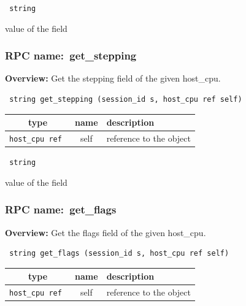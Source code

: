 \vspace{0.3cm}

{\tt 
string
}


value of the field
\vspace{0.3cm}
\vspace{0.3cm}
\vspace{0.3cm}
\subsubsection{RPC name:~get\_stepping}

{\bf Overview:} 
Get the stepping field of the given host\_cpu.

\begin{verbatim} string get_stepping (session_id s, host_cpu ref self)\end{verbatim}



 
\vspace{0.3cm}
\begin{tabular}{|c|c|p{7cm}|}
 \hline
{\bf type} & {\bf name} & {\bf description} \\ \hline
{\tt host\_cpu ref } & self & reference to the object \\ \hline 

\end{tabular}

\vspace{0.3cm}

{\tt 
string
}


value of the field
\vspace{0.3cm}
\vspace{0.3cm}
\vspace{0.3cm}
\subsubsection{RPC name:~get\_flags}

{\bf Overview:} 
Get the flags field of the given host\_cpu.

\begin{verbatim} string get_flags (session_id s, host_cpu ref self)\end{verbatim}



 
\vspace{0.3cm}
\begin{tabular}{|c|c|p{7cm}|}
 \hline
{\bf type} & {\bf name} & {\bf description} \\ \hline
{\tt host\_cpu ref } & self & reference to the object \\ \hline 

\end{tabular}

